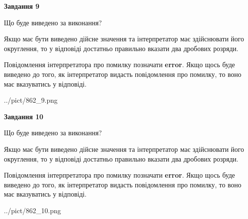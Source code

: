 \documentclass[12pt, ukrainian]{article}
\begin{document}
{\begin {Large}
{\begin {center}\textbf{Завдання 9}\end {center}}\par
Що буде виведено за виконання? \par

Якщо має бути виведено дійсне значення та інтерпретатор має здійснювати його округлення, 
то у відповіді достатньо правильно вказати два дробових розряди.

Повідомлення інтерпретатора про помилку позначати \textbf{error}.
Якщо щось буде виведено до того, як інтерпретатор видасть повідомлення про помилку, 
то воно має вказуватись у відповіді. \par

\begin{center}
	{../pict/862_9.png}
\end{center}
\newpage

{\begin {center}\textbf{Завдання 10}\end {center}}\par
Що буде виведено за виконання? \par

Якщо має бути виведено дійсне значення та інтерпретатор має здійснювати його округлення, 
то у відповіді достатньо правильно вказати два дробових розряди.

Повідомлення інтерпретатора про помилку позначати \textbf{error}.
Якщо щось буде виведено до того, як інтерпретатор видасть повідомлення про помилку, 
то воно має вказуватись у відповіді. \par

\begin{center}
	{../pict/862_10.png}
\end{center}
\newpage

\end {Large}}
\end{document}
